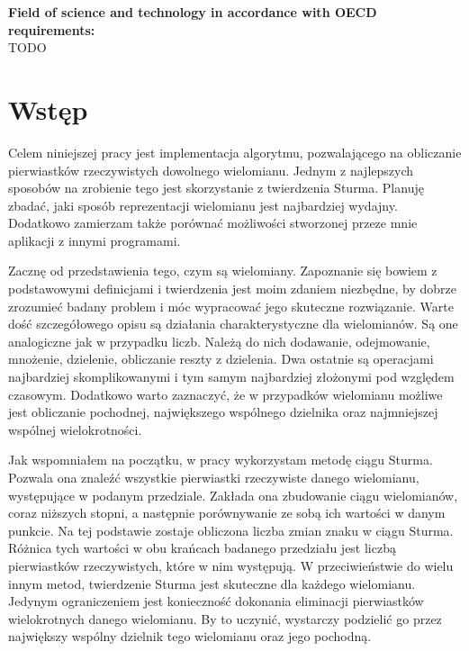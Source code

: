 \documentclass[oneside,a4paper]{book}
\begin{document}
	\vspace{12pt}
	\noindent\textbf{Field of science and technology in accordance with OECD requirements:}\\ 
	TODO	
	
	\tableofcontents
	
	\chapter{Wstęp}

	Celem niniejszej pracy jest implementacja algorytmu, pozwalającego na obliczanie pierwiastków rzeczywistych dowolnego wielomianu. Jednym z najlepszych sposobów na zrobienie tego jest skorzystanie z twierdzenia Sturma. Planuję zbadać, jaki sposób reprezentacji wielomianu jest najbardziej wydajny. Dodatkowo zamierzam także porównać możliwości stworzonej przeze mnie aplikacji z innymi programami.
	
	Zacznę od przedstawienia tego, czym są wielomiany. Zapoznanie się bowiem z podstawowymi definicjami i twierdzenia jest moim zdaniem niezbędne, by dobrze zrozumieć badany problem i móc wypracować jego skuteczne rozwiązanie. Warte dość szczegółowego opisu są działania charakterystyczne dla wielomianów. Są one analogiczne jak w przypadku liczb. Należą do nich dodawanie, odejmowanie, mnożenie, dzielenie, obliczanie reszty z dzielenia. Dwa ostatnie są operacjami najbardziej skomplikowanymi i tym samym najbardziej złożonymi pod względem czasowym. Dodatkowo warto zaznaczyć, że w przypadków wielomianu możliwe jest obliczanie pochodnej, największego wspólnego dzielnika oraz najmniejszej wspólnej wielokrotności.
	
	Jak wspomniałem na początku, w pracy wykorzystam metodę ciągu Sturma. Pozwala ona znaleźć wszystkie pierwiastki rzeczywiste danego wielomianu, występujące w podanym przedziale. Zakłada ona zbudowanie ciągu wielomianów, coraz niższych stopni, a następnie porównywanie ze sobą ich wartości w danym punkcie. Na tej podstawie zostaje obliczona liczba zmian znaku w ciągu Sturma. Różnica tych wartości w obu krańcach badanego przedziału jest liczbą pierwiastków rzeczywistych, które w nim występują. W przeciwieństwie do wielu innym metod, twierdzenie Sturma jest skuteczne dla każdego wielomianu. Jedynym ograniczeniem jest konieczność dokonania eliminacji pierwiastków wielokrotnych danego wielomianu. By to uczynić, wystarczy podzielić go przez największy wspólny dzielnik tego wielomianu oraz jego pochodną.
	
\end{document}
